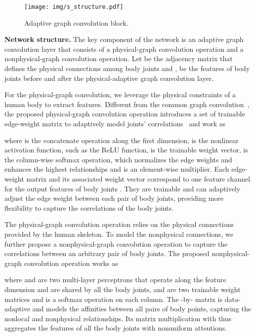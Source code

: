 \documentclass[letterpaper]{article} \usepackage{aaai21}  \usepackage{times}  \usepackage{helvet} \usepackage{courier}  \usepackage[hyphens]{url}  \usepackage{graphicx} \urlstyle{rm} \def\UrlFont{\rm}  \usepackage{natbib}  \usepackage{caption} \frenchspacing  \setlength{\pdfpagewidth}{8.5in}  \setlength{\pdfpageheight}{11in}
\begin{document}
\begin{figure}[t] 
\centering
\texttt{[image: img/s\_structure.pdf]} 
\vspace{-2mm}
\caption{\small Adaptive graph convolution block.} 
\label{fig:student}
\vspace{-5mm}
\end{figure}

\textbf{Network structure.}
The key component of the network is an adaptive graph convolution layer that consists of a physical-graph convolution operation and a nonphysical-graph convolution operation. 
Let  be the adjacency matrix that defines the physical connections among body joints and 
,  be the features of body joints before and after the physical-adaptive graph convolution layer. 

For the physical-graph convolution, we leverage the physical constraints of a human body to extract features. Different from the common graph convolution~\cite{kipf2016semi}, the proposed physical-graph convolution operation introduces a set of trainable edge-weight matrix  to adaptively model joints' correlations~\cite{zhao2019semantic} and work as

where  is the concatenate operation along the first dimension,  is the nonlinear activation function, such as the ReLU function,  is the trainable weight vector,  is the column-wise softmax operation, which normalizes the edge weights and enhances the highest relationships and  is an element-wise multiplier. Each edge-weight matrix  and its associated weight vector  correspond to one feature channel for the output features of body joints . They are trainable and can adaptively adjust the edge weight between each pair of body joints, providing more flexibility to capture the correlations of the body joints.

The physical-graph convolution operation relies on the physical connections provided by the human skeleton. To model the nonphysical connections, we further propose a nonphysical-graph convolution operation to capture the correlations between an arbitrary pair of body joints. The proposed nonphysical-graph convolution operation works as 

where  and  are two multi-layer perceptrons that operate along the feature dimension and are shared by all the body joints,  and  are two trainable weight matrices and  is a softmax operation on each column. The -by- matrix  is data-adaptive and models the affinities between all pairs of body points, capturing the nonlocal and nonphysical relationships. Its matrix multiplication with  thus aggregates the features of all the body joints with nonuniform attentions. 
\end{document}
